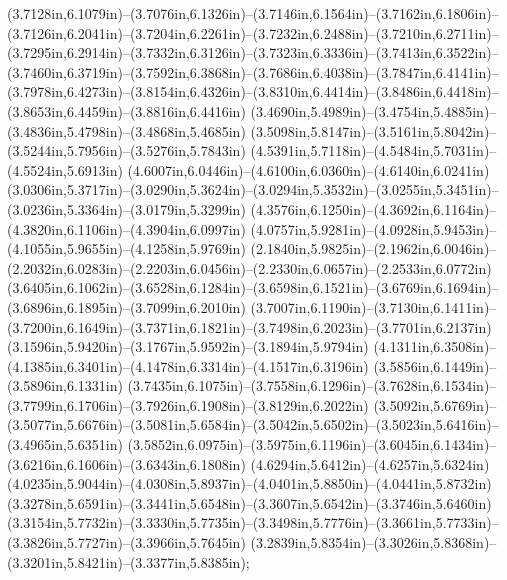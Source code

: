 (3.7128in,6.1079in)--(3.7076in,6.1326in)--(3.7146in,6.1564in)--(3.7162in,6.1806in)--(3.7126in,6.2041in)--(3.7204in,6.2261in)--(3.7232in,6.2488in)--(3.7210in,6.2711in)--(3.7295in,6.2914in)--(3.7332in,6.3126in)--(3.7323in,6.3336in)--(3.7413in,6.3522in)--(3.7460in,6.3719in)--(3.7592in,6.3868in)--(3.7686in,6.4038in)--(3.7847in,6.4141in)--(3.7978in,6.4273in)--(3.8154in,6.4326in)--(3.8310in,6.4414in)--(3.8486in,6.4418in)--(3.8653in,6.4459in)--(3.8816in,6.4416in) (3.4690in,5.4989in)--(3.4754in,5.4885in)--(3.4836in,5.4798in)--(3.4868in,5.4685in) (3.5098in,5.8147in)--(3.5161in,5.8042in)--(3.5244in,5.7956in)--(3.5276in,5.7843in) (4.5391in,5.7118in)--(4.5484in,5.7031in)--(4.5524in,5.6913in) (4.6007in,6.0446in)--(4.6100in,6.0360in)--(4.6140in,6.0241in) (3.0306in,5.3717in)--(3.0290in,5.3624in)--(3.0294in,5.3532in)--(3.0255in,5.3451in)--(3.0236in,5.3364in)--(3.0179in,5.3299in) (4.3576in,6.1250in)--(4.3692in,6.1164in)--(4.3820in,6.1106in)--(4.3904in,6.0997in) (4.0757in,5.9281in)--(4.0928in,5.9453in)--(4.1055in,5.9655in)--(4.1258in,5.9769in) (2.1840in,5.9825in)--(2.1962in,6.0046in)--(2.2032in,6.0283in)--(2.2203in,6.0456in)--(2.2330in,6.0657in)--(2.2533in,6.0772in) (3.6405in,6.1062in)--(3.6528in,6.1284in)--(3.6598in,6.1521in)--(3.6769in,6.1694in)--(3.6896in,6.1895in)--(3.7099in,6.2010in) (3.7007in,6.1190in)--(3.7130in,6.1411in)--(3.7200in,6.1649in)--(3.7371in,6.1821in)--(3.7498in,6.2023in)--(3.7701in,6.2137in) (3.1596in,5.9420in)--(3.1767in,5.9592in)--(3.1894in,5.9794in) (4.1311in,6.3508in)--(4.1385in,6.3401in)--(4.1478in,6.3314in)--(4.1517in,6.3196in) (3.5856in,6.1449in)--(3.5896in,6.1331in) (3.7435in,6.1075in)--(3.7558in,6.1296in)--(3.7628in,6.1534in)--(3.7799in,6.1706in)--(3.7926in,6.1908in)--(3.8129in,6.2022in) (3.5092in,5.6769in)--(3.5077in,5.6676in)--(3.5081in,5.6584in)--(3.5042in,5.6502in)--(3.5023in,5.6416in)--(3.4965in,5.6351in) (3.5852in,6.0975in)--(3.5975in,6.1196in)--(3.6045in,6.1434in)--(3.6216in,6.1606in)--(3.6343in,6.1808in) (4.6294in,5.6412in)--(4.6257in,5.6324in) (4.0235in,5.9044in)--(4.0308in,5.8937in)--(4.0401in,5.8850in)--(4.0441in,5.8732in) (3.3278in,5.6591in)--(3.3441in,5.6548in)--(3.3607in,5.6542in)--(3.3746in,5.6460in) (3.3154in,5.7732in)--(3.3330in,5.7735in)--(3.3498in,5.7776in)--(3.3661in,5.7733in)--(3.3826in,5.7727in)--(3.3966in,5.7645in) (3.2839in,5.8354in)--(3.3026in,5.8368in)--(3.3201in,5.8421in)--(3.3377in,5.8385in);
